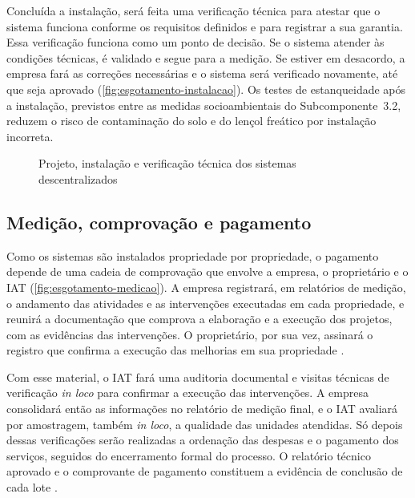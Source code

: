 Concluída a instalação, será feita uma verificação técnica para atestar que o
sistema funciona conforme os requisitos definidos e para registrar a sua
garantia. Essa verificação funciona como um ponto de decisão. Se o sistema
atender às condições técnicas, é validado e segue para a medição. Se estiver
em desacordo, a empresa fará as correções necessárias e o sistema será
verificado novamente, até que seja aprovado (\autoref{fig:esgotamento-instalacao}).
Os testes de estanqueidade após a instalação, previstos entre as medidas
socioambientais do Subcomponente~3.2, reduzem o risco de contaminação do solo
e do lençol freático por instalação incorreta.

\begin{figure}[htbp]
  \centering
  \caption{Projeto, instalação e verificação técnica dos sistemas descentralizados}
  \label{fig:esgotamento-instalacao}
\end{figure}

\subsection{Medição, comprovação e pagamento}
\label{subsec:esgotamento-medicao}

Como os sistemas são instalados propriedade por propriedade, o pagamento
depende de uma cadeia de comprovação que envolve a empresa, o proprietário e
o IAT (\autoref{fig:esgotamento-medicao}). A empresa registrará, em relatórios
de medição, o andamento das atividades e as intervenções executadas em cada
propriedade, e reunirá a documentação que comprova a elaboração e a execução
dos projetos, com as evidências das intervenções. O proprietário, por sua
vez, assinará o registro que confirma a execução das melhorias em sua
propriedade \cite{mop2026}.

Com esse material, o IAT fará uma auditoria documental e visitas técnicas de
verificação \textit{in loco} para confirmar a execução das intervenções. A
empresa consolidará então as informações no relatório de medição final, e o
IAT avaliará por amostragem, também \textit{in loco}, a qualidade das unidades
atendidas. Só depois dessas verificações serão realizadas a ordenação das
despesas e o pagamento dos serviços, seguidos do encerramento formal do
processo. O relatório técnico aprovado e o comprovante de pagamento
constituem a evidência de conclusão de cada lote \cite{mop2026}.


